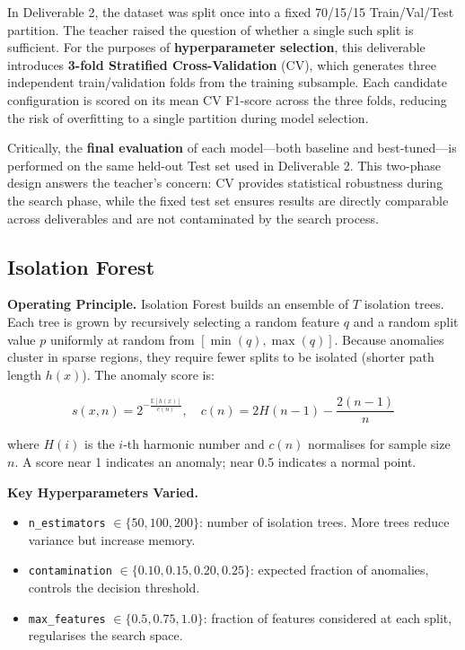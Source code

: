 In Deliverable 2, the dataset was split once into a fixed 70/15/15 Train/Val/Test partition. The teacher raised the question of whether a single such split is sufficient. For the purposes of \textbf{hyperparameter selection}, this deliverable introduces \textbf{3-fold Stratified Cross-Validation} (CV), which generates three independent train/validation folds from the training subsample. Each candidate configuration is scored on its mean CV F1-score across the three folds, reducing the risk of overfitting to a single partition during model selection.

Critically, the \textbf{final evaluation} of each model—both baseline and best-tuned—is performed on the same held-out Test set used in Deliverable 2. This two-phase design answers the teacher's concern: CV provides statistical robustness during the search phase, while the fixed test set ensures results are directly comparable across deliverables and are not contaminated by the search process.

\subsection{Isolation Forest}

\textbf{Operating Principle.}
Isolation Forest \cite{liu2008isolation} builds an ensemble of $T$ isolation trees. Each tree is grown by recursively selecting a random feature $q$ and a random split value $p$ uniformly at random from $[\min(q), \max(q)]$. Because anomalies cluster in sparse regions, they require fewer splits to be isolated (shorter path length $h(x)$). The anomaly score is:

\begin{equation}
  s(x, n) = 2^{-\frac{\mathbb{E}[h(x)]}{c(n)}},
  \quad c(n) = 2H(n-1) - \frac{2(n-1)}{n}
\end{equation}

where $H(i)$ is the $i$-th harmonic number and $c(n)$ normalises for sample size $n$. A score near 1 indicates an anomaly; near 0.5 indicates a normal point.

\textbf{Key Hyperparameters Varied.}
\begin{itemize}
  \item \texttt{n\_estimators} $\in \{50, 100, 200\}$: number of isolation trees. More trees reduce variance but increase memory.
  \item \texttt{contamination} $\in \{0.10, 0.15, 0.20, 0.25\}$: expected fraction of anomalies, controls the decision threshold.
  \item \texttt{max\_features} $\in \{0.5, 0.75, 1.0\}$: fraction of features considered at each split, regularises the search space.
\end{itemize}

